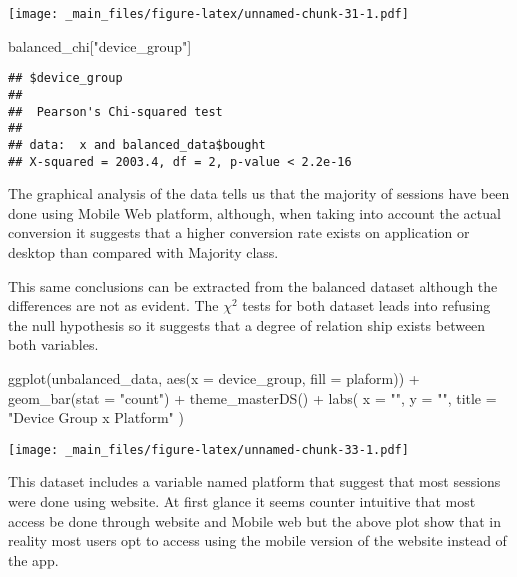 \documentclass[
]{book}
\newenvironment{Shaded}{\begin{snugshade}}{\end{snugshade}}
\newcommand{\AttributeTok}[1]{\textcolor[rgb]{0.77,0.63,0.00}{#1}}
\newcommand{\FunctionTok}[1]{\textcolor[rgb]{0.00,0.00,0.00}{#1}}
\newcommand{\NormalTok}[1]{#1}
\newcommand{\SpecialCharTok}[1]{\textcolor[rgb]{0.00,0.00,0.00}{#1}}
\newcommand{\StringTok}[1]{\textcolor[rgb]{0.31,0.60,0.02}{#1}}
\begin{document}
\texttt{[image: \_main\_files/figure-latex/unnamed-chunk-31-1.pdf]}

\begin{Shaded}
\begin{Highlighting}[]
\NormalTok{balanced\_chi[}\StringTok{"device\_group"}\NormalTok{]}
\end{Highlighting}
\end{Shaded}

\begin{verbatim}
## $device_group
## 
##  Pearson's Chi-squared test
## 
## data:  x and balanced_data$bought
## X-squared = 2003.4, df = 2, p-value < 2.2e-16
\end{verbatim}

The graphical analysis of the data tells us that the majority of sessions have been done using Mobile Web platform, although, when taking into account the actual conversion it suggests that a higher conversion rate exists on application or desktop than compared with Majority class.

This same conclusions can be extracted from the balanced dataset although the differences are not as evident. The \(\chi ^2\) tests for both dataset leads into refusing the null hypothesis so it suggests that a degree of relation ship exists between both variables.

\begin{Shaded}
\begin{Highlighting}[]
\FunctionTok{ggplot}\NormalTok{(unbalanced\_data, }\FunctionTok{aes}\NormalTok{(}\AttributeTok{x =}\NormalTok{ device\_group, }\AttributeTok{fill =}\NormalTok{ plaform)) }\SpecialCharTok{+} 
  \FunctionTok{geom\_bar}\NormalTok{(}\AttributeTok{stat =} \StringTok{"count"}\NormalTok{) }\SpecialCharTok{+} 
  \FunctionTok{theme\_masterDS}\NormalTok{() }\SpecialCharTok{+}
    \FunctionTok{labs}\NormalTok{(}
      \AttributeTok{x =} \StringTok{""}\NormalTok{,}
      \AttributeTok{y =} \StringTok{""}\NormalTok{,}
      \AttributeTok{title =} \StringTok{"Device Group x Platform"}
\NormalTok{    )}
\end{Highlighting}
\end{Shaded}

\texttt{[image: \_main\_files/figure-latex/unnamed-chunk-33-1.pdf]}

This dataset includes a variable named platform that suggest that most sessions were done using website. At first glance it seems counter intuitive that most access be done through website and Mobile web but the above plot show that in reality most users opt to access using the mobile version of the website instead of the app.
\end{document}
